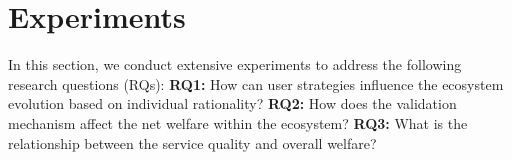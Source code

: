 \section{Experiments}


In this section, we conduct extensive experiments to address the following research questions (RQs): \textbf{RQ1:} How can user strategies influence the ecosystem evolution based on individual rationality? \textbf{RQ2:} How does the validation mechanism affect the net welfare within the ecosystem?  \textbf{RQ3:} What is the relationship between the service quality and overall welfare?






    





